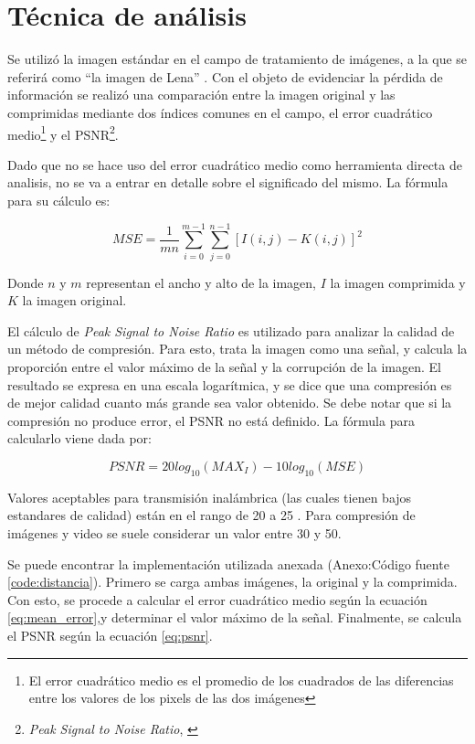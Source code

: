 \documentclass[twocolumn,a4paper,10pt]{article}
\begin{document}
\section{T\'ecnica de an\'alisis}
\label{sec:tecnica}

Se utiliz\'o la imagen est\'andar en el campo de tratamiento de im\'agenes, a la que se referirá como ``la imagen de Lena'' \cite{lena} \cite{lenaweb}. 
Con el objeto de evidenciar la pérdida de información se realizó una comparación entre la imagen original y las comprimidas mediante dos índices 
comunes en el campo, el error cuadrático medio\footnote{El error cuadrático medio es el promedio de los cuadrados de las diferencias entre los valores 
de los pixels de las dos imágenes} y el PSNR\footnote{\textit{Peak Signal to Noise Ratio}, \cite{PSNR}}.  

Dado que no se hace uso del error cuadr\'atico medio como herramienta directa de analisis, no se va a entrar en detalle sobre el significado del mismo. 
La f\'ormula para su c\'alculo es:

\begin{equation}
    \label{eq:mean_error}
    MSE = \frac{1}{m n} \sum_{i=0}^{m -1} \sum_{j = 0}^{n -1} [ I(i, j) - K(i, j) ]^2
\end{equation}

Donde $n$ y $m$ representan el ancho y alto de la imagen, $I$ la imagen comprimida y $K$ la imagen original.

El c\'alculo de \textit{Peak Signal to Noise Ratio} es utilizado para analizar la calidad de un m\'etodo de compresi\'on.
Para esto, trata la imagen como una señal, y calcula la proporci\'on entre el valor m\'aximo de la señal y la corrupci\'on de la imagen.
El resultado se expresa en una escala logar\'itmica, y se dice que una compresi\'on es de mejor calidad cuanto m\'as grande sea valor obtenido.
Se debe notar que si la compresi\'on no produce error, el PSNR no est\'a definido.
La f\'ormula para calcularlo viene dada por:

\begin{equation}
    \label{eq:psnr}
    PSNR = 20 log_{10}(MAX_I) - 10 log_{10}(MSE)
\end{equation}

Valores aceptables para transmisión inalámbrica (las cuales tienen bajos estandares de calidad) están en el rango de 20 a 25 \cite{Wikipedia_PSNR}.
Para compresi\'on de im\'agenes y video se suele considerar un valor entre 30 y 50.

Se puede encontrar la implementaci\'on utilizada anexada (Anexo:C\'odigo fuente \ref{code:distancia}).
Primero se carga ambas im\'agenes, la original y la comprimida.
Con esto, se procede a calcular el error cuadr\'atico medio seg\'un la ecuaci\'on \ref{eq:mean_error},y determinar el valor m\'aximo de la señal.
Finalmente, se calcula el PSNR seg\'un la ecuaci\'on \ref{eq:psnr}.
\end{document}
